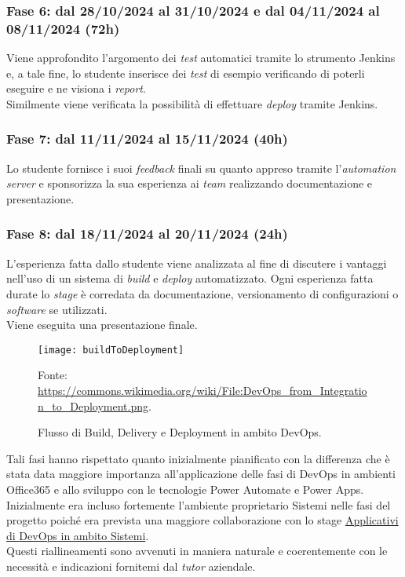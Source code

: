 \subsubsection*{Fase 6: dal 28/10/2024 al 31/10/2024 e dal 04/11/2024 al 08/11/2024 (72h)}
Viene approfondito l'argomento dei \emph{test} automatici tramite lo strumento Jenkins e, a tale fine, lo studente inserisce dei \emph{test} di esempio verificando di poterli eseguire e ne visiona i \emph{report}.\\
Similmente viene verificata la possibilità di effettuare \emph{deploy} tramite Jenkins.

\subsubsection*{Fase 7: dal 11/11/2024 al 15/11/2024 (40h) }
Lo studente fornisce i suoi \emph{feedback} finali su quanto appreso tramite l'\emph{automation server} e sponsorizza la sua esperienza ai \emph{team} realizzando documentazione e presentazione.\\

\subsubsection*{Fase 8: dal 18/11/2024 al 20/11/2024 (24h) }
L'esperienza fatta dallo studente viene analizzata al fine di discutere i vantaggi nell'uso di un sistema di \emph{build} e \emph{deploy} automatizzato. Ogni esperienza fatta durate lo \emph{stage} è corredata da documentazione, versionamento di configurazioni o \emph{software} se utilizzati.\\
Viene eseguita una presentazione finale.\\
\begin{figure}[htbp] 
    \centering 
    \texttt{[image: buildToDeployment]}
    \caption{Flusso di Build, Delivery e Deployment in ambito DevOps.} 
    \label{fig:buildToDeployment}
    \vspace{1mm}
    Fonte: \url{https://commons.wikimedia.org/wiki/File:DevOps_from_Integration_to_Deployment.png}.
\end{figure}
\newline \newline \noindent 
Tali fasi hanno rispettato quanto inizialmente pianificato con la differenza che è stata data maggiore importanza all'applicazione delle fasi di \gls{DevOps} in ambienti Office365 e allo sviluppo con le tecnologie Power Automate e Power Apps.\\
Inizialmente era incluso fortemente l'ambiente proprietario \gls{Sistemi} nelle fasi del progetto poiché era prevista una maggiore collaborazione con lo stage \hyperref[stageDavide]{Applicativi di \gls{DevOps} in ambito Sistemi}.\\
Questi riallineamenti sono avvenuti in maniera naturale e coerentemente con le necessità e indicazioni fornitemi dal \emph{tutor} aziendale.\\
